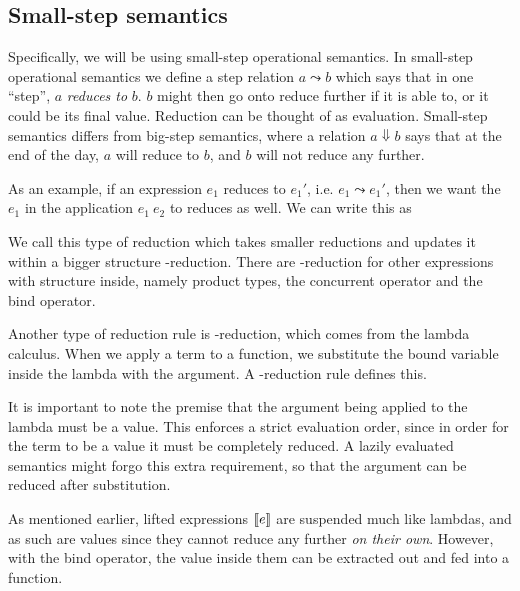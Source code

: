 \subsection{Small-step semantics}

Specifically, we will be using small-step operational semantics. In
small-step operational semantics we define a step relation
$a \leadsto b$ which says that in one ``step'', $a$ \textit{reduces to}
$b$. $b$ might then go onto reduce further if it is able to, or it
could be its final value. Reduction can be thought of as
evaluation. Small-step semantics differs from big-step semantics,
where a relation $a \Downarrow b$ says that at the end of the day, $a$ will
reduce to $b$, and $b$ will not reduce any further.


As an example, if an expression $e_1$ reduces to $e_1'$, i.e. $e_1 \leadsto
e_1'$, then we want the $e_1$ in the application $e_1 \ e_2$ to reduces
as well. We can write this as
\begin{mathpar}
\end{mathpar}

We call this type of reduction which takes smaller reductions and
updates it within a bigger structure \xi-reduction. There are
\xi-reduction for other expressions with structure inside, namely
product types, the concurrent operator and the bind operator.

Another
type of reduction rule is \beta-reduction, which comes from the lambda
calculus. When we apply a term to a function, we substitute the bound
variable inside the lambda with the argument. A \beta-reduction rule
defines this.
\begin{mathpar}
\end{mathpar}

It is important to note the premise that the argument being applied to
the lambda must be a value. This enforces a strict evaluation order,
since in order for the term to be a value it must be completely
reduced. A lazily evaluated semantics might forgo this extra
requirement, so that the argument can be reduced after substitution.

As mentioned earlier, lifted expressions $\lift{e}$ are suspended much
like lambdas, and as such are values since they cannot reduce any
further \textit{on their own}. However, with the bind operator, the
value inside them can be extracted out and fed into a function.
\begin{mathpar}
\end{mathpar}

